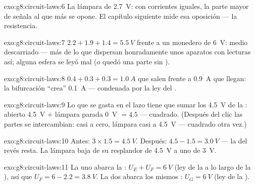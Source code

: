 \begin{solution}{exo:g8:circuit-laws:6}
La lámpara de \qty{2.7}{V}: con corrientes iguales, la parte mayor de
 señala al que más se opone. El capítulo siguiente
mide esa oposición --- la resistencia.
\end{solution}

\begin{solution}{exo:g8:circuit-laws:7}
$2.2 + 1.9 + 1.4 = \qty{5.5}{V}$ frente a un monedero de \qty{6}{V}:
medio  descarriado --- más de lo que dispersan honradamente
unos aparatos con lecturas así; alguna esfera se leyó mal (o quedó una
parte sin ).
\end{solution}

\begin{solution}{exo:g8:circuit-laws:8}
$0.4 + 0.3 + 0.3 = \qty{1.0}{A}$ que salen frente a \qty{0.9}{A} que
llegan: la bifurcación ``crea'' \qty{0.1}{A} --- condenada por la ley
del .
\end{solution}

\begin{solution}{exo:g8:circuit-laws:9}
Lo que se gasta en el lazo tiene que sumar los \qty{4.5}{V} de la
:  abierto \qty{4.5}{V} $+$ lámpara
parada \qty{0}{V} $= 4.5$ --- cuadrado. (Después del clic las partes se
intercambian:  casi a cero, lámpara casi a
\qty{4.5}{V} --- cuadrado otra vez.)
\end{solution}

\begin{solution}{exo:g8:circuit-laws:10}
Antes: $3 \times 1.5 = \qty{4.5}{V}$. Después: $4.5 - 1.5 =
\qty{3.0}{V}$ --- la  del revés resta. La lámpara baja de su
resplandor de \qty{4.5}{V} a uno de \qty{3}{V}.
\end{solution}

\begin{solution}{exo:g8:circuit-laws:11}
La  uno abarca la : $U_E + U_F = \qty{6}{V}$
(ley de la   a lo largo de la ), así
que $U_F = 6 - 2.2 = \qty{3.8}{V}$. La  dos abarca los
mismos : $U_G = \qty{6}{V}$ (ley de la
 ).
\end{solution}

